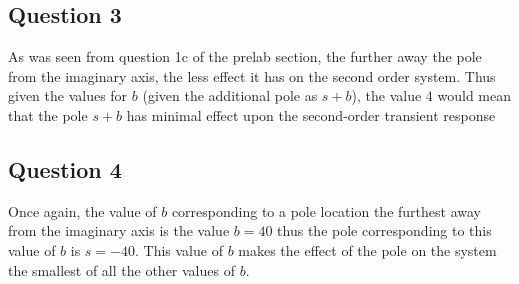 \documentclass[12pt, a4paper]{article}
\begin{document}
			\subsection{Question 3} %
			\label{sub:question_3}
			As was seen from question 1c of the prelab section, the further away the pole from the imaginary axis, the less effect it has on the second order system. Thus given the values for $b$ (given the additional pole as $s+b$), the value $4$ would mean that the pole $s+b$ has minimal effect upon the second-order transient response	

			\subsection{Question 4} %
			\label{sub:question_4}
			Once again, the value of $b$ corresponding to a pole location the furthest away from the imaginary axis is the value $b=40$ thus the pole corresponding to this value of $b$ is $s=-40$. This value of $b$ makes the effect of the pole on the system the smallest of all the other values of $b$.
			

			
\end{document}
